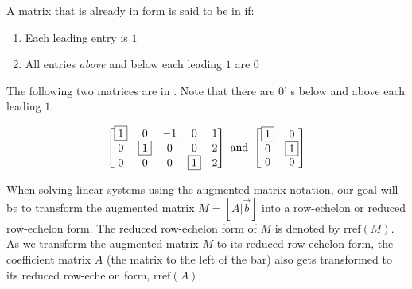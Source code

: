 \documentclass{ximera}
\begin{document}
\begin{definition}\label{def:rref}
A matrix that is already in  form is said to be in  if:
\begin{enumerate}
\item Each leading entry is $1$
\item All entries {\it above} and below each leading $1$ are $0$
\end{enumerate}
\end{definition}

The following two matrices are in .  Note that there are $0$'
s below and above each leading $1$.
 
$$\begin{bmatrix} 
 \fbox{1}&0&-1&0&1\\0&\fbox{1}&0&0&2\\0&0&0&\fbox{1}&2
 \end{bmatrix}\quad\text{and}\quad\begin{bmatrix}
 \fbox{1}&0\\0&\fbox{1}\\0&0
 \end{bmatrix}$$
  
 When solving linear systems using the augmented matrix notation, our goal will be to transform the augmented matrix $M=[A|\vec{b}]$ into a row-echelon or reduced row-echelon form.  The reduced row-echelon form of $M$ is denoted by
$\mbox{rref}(M)$.  As we transform the augmented matrix $M$ to its reduced row-echelon form, the coefficient matrix $A$ (the matrix to the left of the bar) also gets transformed to its reduced row-echelon form, $\mbox{rref}(A)$.
 
\end{document}
